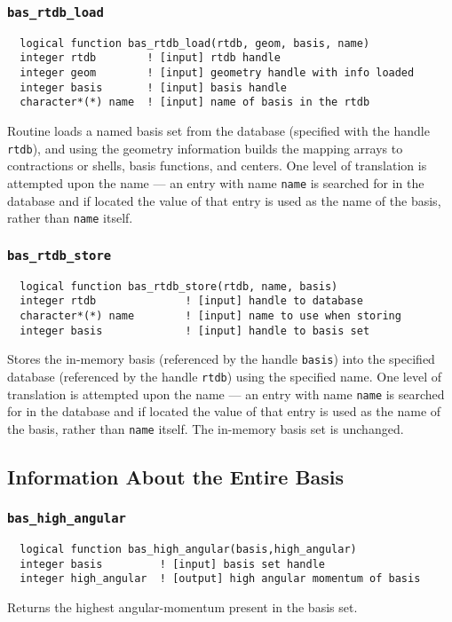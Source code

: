 \subsubsection{{\tt bas\_rtdb\_load}}
\begin{verbatim}
  logical function bas_rtdb_load(rtdb, geom, basis, name)
  integer rtdb        ! [input] rtdb handle      
  integer geom        ! [input] geometry handle with info loaded
  integer basis       ! [input] basis handle
  character*(*) name  ! [input] name of basis in the rtdb
\end{verbatim}
Routine loads a named basis set from the database (specified with the
handle {\tt rtdb}), and using the geometry information builds the
mapping arrays to contractions or shells, basis functions, and
centers.  One level of translation is attempted upon the name --- an
entry with name {\tt name} is searched for in the database and if
located the value of that entry is used as the name of the basis,
rather than {\tt name} itself.

\subsubsection{{\tt bas\_rtdb\_store}}
\begin{verbatim}
  logical function bas_rtdb_store(rtdb, name, basis)
  integer rtdb              ! [input] handle to database
  character*(*) name        ! [input] name to use when storing
  integer basis             ! [input] handle to basis set
\end{verbatim}
Stores the in-memory basis (referenced by the handle {\tt basis}) into
the specified database (referenced by the handle {\tt rtdb}) using the
specified name.  One level of translation is attempted upon the name
--- an entry with name {\tt name} is searched for in the database and
if located the value of that entry is used as the name of the basis,
rather than {\tt name} itself.  The in-memory basis set is unchanged.

\subsection{Information About the Entire Basis}

\subsubsection{{\tt bas\_high\_angular}}
\begin{verbatim}
  logical function bas_high_angular(basis,high_angular)
  integer basis         ! [input] basis set handle
  integer high_angular  ! [output] high angular momentum of basis
\end{verbatim}
Returns the highest angular-momentum present in the basis set.


